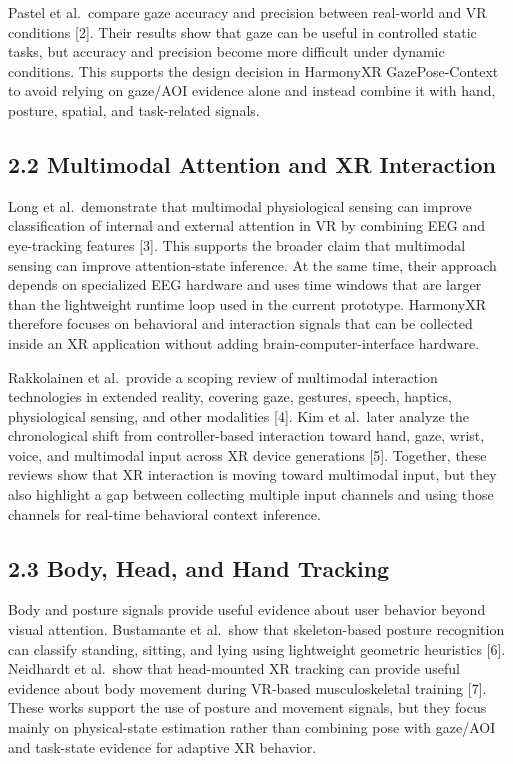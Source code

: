 \documentclass[
  10pt,
]{article}
\begin{document}
Pastel et al.~compare gaze accuracy and precision between real-world and
VR conditions {[}2{]}. Their results show that gaze can be useful in
controlled static tasks, but accuracy and precision become more
difficult under dynamic conditions. This supports the design decision in
HarmonyXR GazePose-Context to avoid relying on gaze/AOI evidence alone
and instead combine it with hand, posture, spatial, and task-related
signals.

\subsection{2.2 Multimodal Attention and XR
Interaction}\label{multimodal-attention-and-xr-interaction}

Long et al.~demonstrate that multimodal physiological sensing can
improve classification of internal and external attention in VR by
combining EEG and eye-tracking features {[}3{]}. This supports the
broader claim that multimodal sensing can improve attention-state
inference. At the same time, their approach depends on specialized EEG
hardware and uses time windows that are larger than the lightweight
runtime loop used in the current prototype. HarmonyXR therefore focuses
on behavioral and interaction signals that can be collected inside an XR
application without adding brain-computer-interface hardware.

Rakkolainen et al.~provide a scoping review of multimodal interaction
technologies in extended reality, covering gaze, gestures, speech,
haptics, physiological sensing, and other modalities {[}4{]}. Kim et
al.~later analyze the chronological shift from controller-based
interaction toward hand, gaze, wrist, voice, and multimodal input across
XR device generations {[}5{]}. Together, these reviews show that XR
interaction is moving toward multimodal input, but they also highlight a
gap between collecting multiple input channels and using those channels
for real-time behavioral context inference.

\subsection{2.3 Body, Head, and Hand
Tracking}\label{body-head-and-hand-tracking}

Body and posture signals provide useful evidence about user behavior
beyond visual attention. Bustamante et al.~show that skeleton-based
posture recognition can classify standing, sitting, and lying using
lightweight geometric heuristics {[}6{]}. Neidhardt et al.~show that
head-mounted XR tracking can provide useful evidence about body movement
during VR-based musculoskeletal training {[}7{]}. These works support
the use of posture and movement signals, but they focus mainly on
physical-state estimation rather than combining pose with gaze/AOI and
task-state evidence for adaptive XR behavior.
\end{document}
